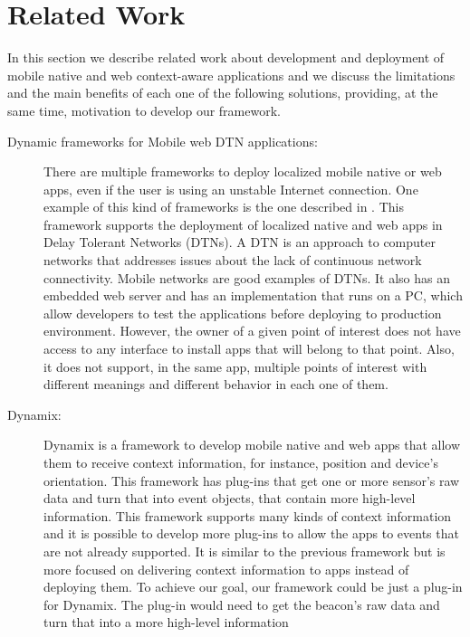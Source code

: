 
%
%

\section{Related Work}
\label{related_work}
In this section we describe related work about
development and deployment of mobile native and web 
context-aware applications and we discuss the 
limitations and the main benefits of each one of
the following solutions, providing, at the same time,
motivation to develop our framework.
\begin{description}
  \item[Dynamic frameworks for Mobile web DTN applications:]
  There are multiple frameworks to deploy localized
  mobile native or web apps, even if the user is using an
  unstable Internet connection. One example of this
  kind of frameworks is the one
  described in \cite{Sankaran2014}.
  This framework supports the deployment of localized 
  native and
  web apps in Delay Tolerant Networks (DTNs).
  A DTN is an approach to computer networks that 
  addresses issues about the lack of continuous network
  connectivity. Mobile networks are good examples of DTNs. 
  It also has an embedded web server 
  and has an implementation that runs on a PC, which allow
  developers to test the applications before deploying
  to production environment.
  However, the owner of a given point of interest does not
  have access to any interface to install apps that will
  belong to that point. Also, it does not support, in the
  same app, multiple points of interest with different
  meanings and different behavior in each one of them. 
  \item[Dynamix:]
  Dynamix \cite{Carlson2012} is a framework to develop
  mobile native and web apps that allow them to receive
  context information, for instance, position and device's
  orientation. This framework has plug-ins that get
  one or more sensor's raw data and turn that into event
  objects, that contain more high-level information.
  This framework supports many kinds of context information
  and it is possible to develop more plug-ins to allow the
  apps to events that are not
  already supported. It is similar to the previous
  framework but is more focused on delivering context
  information to apps instead of deploying them.
  To achieve our goal, our framework could be just a
  plug-in for Dynamix. The plug-in would
  need to get the beacon's raw data and
  turn that into a more high-level information 

\end{description}
